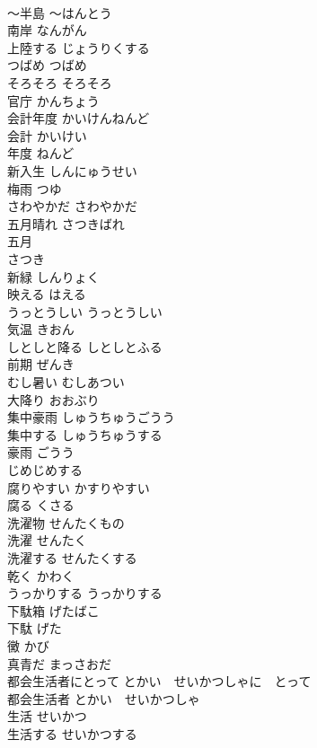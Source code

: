 \documentclass[8pt]{extreport}
\begin{document}
\begin{CJK}{UTF8}{min}
\\	〜半島	〜はんとう	
\\	南岸	なんがん	
\\	上陸する	じょうりくする	
\\	つばめ	つばめ	
\\	そろそろ	そろそろ	
\\	官庁	かんちょう	
\\	会計年度	かいけんねんど	
\\	会計	かいけい	
\\	年度	ねんど	
\\	新入生	しんにゅうせい	
\\	梅雨	つゆ	
\\	さわやかだ	さわやかだ	
\\	五月晴れ	さつきばれ	
\\	五月　
\\	さつき	
\\	新緑	しんりょく	
\\	映える	はえる	
\\	うっとうしい	うっとうしい	
\\	気温	きおん	
\\	しとしと降る	しとしとふる	
\\	前期	ぜんき	
\\	むし暑い	むしあつい	
\\	大降り	おおぶり	
\\	集中豪雨	しゅうちゅうごうう	
\\	集中する	しゅうちゅうする	
\\	豪雨	ごうう	
\\	じめじめする	
\\	腐りやすい	かすりやすい	
\\	腐る	くさる	
\\	洗濯物	せんたくもの	
\\	洗濯	せんたく	
\\	洗濯する	せんたくする	
\\	乾く	かわく	
\\	うっかりする	うっかりする	
\\	下駄箱	げたばこ	
\\	下駄	げた	
\\	黴	かび	
\\	真青だ	まっさおだ	
\\	都会生活者にとって	とかい　せいかつしゃに　とって	
\\	都会生活者	とかい　せいかつしゃ	
\\	生活	せいかつ	
\\	生活する	せいかつする	

\end{CJK}
\end{document}
